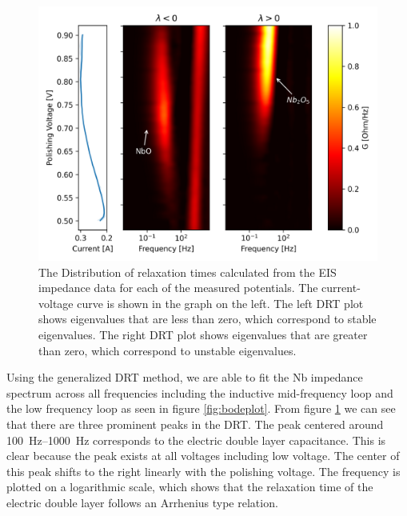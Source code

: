 \begin{figure}
  
  \includegraphics[width=\textwidth]{./figures/gamma.png}  
  \caption{The Distribution of relaxation times calculated from the EIS impedance data for each of the measured potentials. The current-voltage curve is shown in the graph on the left. The left DRT plot shows eigenvalues that are less than zero, which correspond to stable eigenvalues. The right DRT plot shows eigenvalues that are greater than zero, which correspond to unstable eigenvalues.}
  \label{fig:gamma}
\end{figure}

Using the generalized DRT method, we are able to fit the Nb impedance spectrum across all frequencies including the inductive mid-frequency loop and the low frequency loop as seen in figure \ref{fig:bodeplot}. From figure \ref{fig:gamma} we can see that there are three prominent peaks in the DRT. The peak centered around \qtyrange{100}{1000}{\hertz} corresponds to the electric double layer capacitance. This is clear because the peak exists at all voltages including low voltage. The center of this peak shifts to the right linearly with the polishing voltage. The frequency is plotted on a logarithmic scale, which shows that the relaxation time of the electric double layer follows an Arrhenius type relation.


